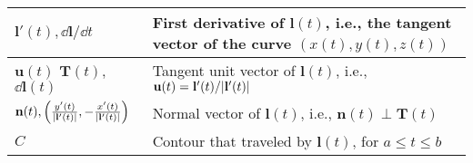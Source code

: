 \begin{xltabular}{\textwidth}{XX}
	\(\mathbf{l}'(t), \dd{\mathbf{l}}/\dd{t}\)                                                                                                                                                                                                                                                         & First derivative of \(\mathbf{l}(t)\), i.e., the tangent vector of the curve \((x(t), y(t), z(t))\) \cite{stewartCalculus2011}                                                                                                                                                                                                      \\ \hline
	\(\mathbf{u}(t)\)\cite{kreyszigAdvancedEngineeringMathematics2008} \(\mathbf{T}(t)\)\cite{stewartCalculus2011}, \(\dd{\mathbf{l}}(t)\)\cite{ramoFieldsWavesCommunication1994}                                                                                                                      & Tangent unit vector of \(\mathbf{l}(t)\), i.e., \newline  \(\mathbf{u}(t) = \mathbf{l}'(t)/\abs{\mathbf{l}'(t)}\)                                                                                                                                                                                                                   \\ \hline
	\(\mathbf{n}(t), \left( \frac{y'(t)}{\abs{\mathbf{l}'(t)}}, -\frac{x'(t)}{\abs{\mathbf{l}'(t)}} \right)\)                                                                                                                                                                                          & Normal vector of \(\mathbf{l}(t)\), i.e., \newline \(\mathbf{n}(t)\perp \mathbf{T}(t) \)\cite{stewartCalculus2011}                                                                                                                                                                                                                  \\ \hline
	\(C\)                                                                                                                                                                                                                                                                                              & Contour that traveled by \(\mathbf{l}(t)\), for \(a \leq t \leq b\) \cite{stewartCalculus2011}                                                                                                                                                                                                                                      \\ \hline

\end{xltabular}
